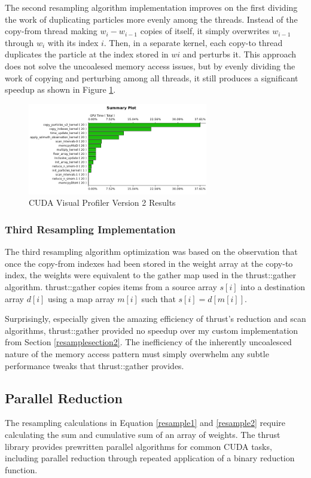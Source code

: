 \documentclass{article}
\begin{document}
The second resampling algorithm implementation improves on the first dividing the work of duplicating particles more evenly among the threads. Instead of the copy-from thread making \(w_{i}-w_{i-1}\) copies of itself, it simply overwrites \(w_{i-1}\) through \(w_{i}\) with its index \(i\). Then, in a separate kernel, each copy-to thread duplicates the particle at the index stored in \(w{i}\) and perturbs it. This approach does not solve the uncoalesed memory access issues, but by evenly dividing the work of copying and perturbing among all threads, it still produces a significant speedup as shown in Figure \ref{profiler2}.

\begin{figure}
\centering
\includegraphics[width=0.7\textwidth]{data/profile_cuda_version2_pic1.png}
\caption{CUDA Visual Profiler Version 2 Results}
\label{profiler2}
\end{figure}

\subsubsection{Third Resampling Implementation}
The third resampling algorithm optimization was based on the observation that once the copy-from indexes had been stored in the weight array at the copy-to index, the weights were equivalent to the gather map used in the thrust::gather algorithm. \cite{thrust} thrust::gather copies items from a source array \(s[i]\) into a destination array \(d[i]\) using a map array \(m[i]\) such that \(s[i]=d[m[i]]\).

Surprisingly, especially given the amazing efficiency of thrust's reduction and scan algorithms, thrust::gather provided no speedup over my custom implementation from Section \ref{resamplesection2}. The inefficiency of the inherently uncoalesced nature of the memory access pattern must simply overwhelm any subtle performance tweaks that thrust::gather provides.

\subsection{Parallel Reduction}
The resampling calculations in Equation \ref{resample1} and \ref{resample2} require calculating the sum and cumulative sum of an array of weights. The thrust library provides prewritten parallel algorithms for common CUDA tasks, including parallel reduction through repeated application of a binary reduction function.\cite{thrust}
\end{document}
